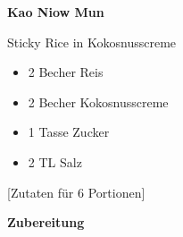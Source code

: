 
\parindent0pt	

\pagestyle{empty}


\textbf{{\LARGE Kao Niow Mun}}%

\hrulefill

Sticky Rice in Kokosnusscreme
\vspace*{\fill}
\begin{multicols}{2}	

\begin{itemize}
\item 2 Becher Reis
\item 2 Becher Kokosnusscreme
\item 1 Tasse Zucker
\item 2 TL Salz
\end{itemize}

\end{multicols}
\vspace{1cm}
\begin{center}
[Zutaten für 6 Portionen]
\end{center}


\vfill
\newpage
\textbf{{\LARGE Zubereitung}}%

\hrulefill

